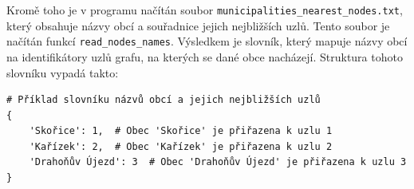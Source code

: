 Kromě toho je v programu načítán soubor \texttt{municipalities\_nearest\_nodes.txt}, který obsahuje názvy obcí a souřadnice jejich nejbližších uzlů. Tento soubor je načítán funkcí \texttt{read\_nodes\_names}. Výsledkem je slovník, který mapuje názvy obcí na identifikátory uzlů grafu, na kterých se dané obce nacházejí. Struktura tohoto slovníku vypadá takto:

\begin{verbatim}
# Příklad slovníku názvů obcí a jejich nejbližších uzlů
{
    'Skořice': 1,  # Obec 'Skořice' je přiřazena k uzlu 1
    'Kařízek': 2,  # Obec 'Kařízek' je přiřazena k uzlu 2
    'Drahoňův Újezd': 3  # Obec 'Drahoňův Újezd' je přiřazena k uzlu 3
}
\end{verbatim}
